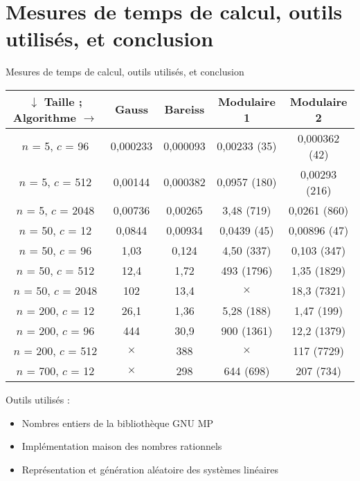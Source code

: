 \documentclass[11pt]{beamer}
\begin{document}
	\section{Mesures de temps de calcul, outils utilisés, et conclusion}
	\begin{frame}{Mesures de temps de calcul, outils utilisés, et conclusion}
		
		{\footnotesize
		\begin{tabular}{|c||c|c|c|c|}
			\hline
			$\downarrow$ Taille ; Algorithme $\rightarrow$ & Gauss & Bareiss & Modulaire 1 & Modulaire 2\\
			\hline
			\hline
			$n$ = 5, $c$ = 96 & 0,000233 & 0,000093 & 0,00233 (35) & 0,000362 (42)\\
			\hline
			$n$ = 5, $c$ = 512 & 0,00144 & 0,000382 & 0,0957 (180) & 0,00293 (216)\\
			\hline
			$n$ = 5, $c$ = 2048 & 0,00736 & 0,00265 & 3,48 (719) & 0,0261 (860)\\
			\hline
			\hline
			$n$ = 50, $c$ = 12 & 0,0844 & 0,00934 & 0,0439 (45) & 0,00896 (47)\\
			\hline
			$n$ = 50, $c$ = 96 & 1,03 & 0,124 & 4,50 (337) & 0,103 (347)\\
			\hline
			$n$ = 50, $c$ = 512 & 12,4 & 1,72 & 493 (1796) & 1,35 (1829)\\
			\hline
			$n$ = 50, $c$ = 2048 & 102 & 13,4 &  $\times$& 18,3 (7321)\\
			\hline
			\hline
			$n$ = 200, $c$ = 12 & 26,1 & 1,36 & 5,28 (188) &  1,47 (199)\\
			\hline
			$n$ = 200, $c$ = 96 & 444 & 30,9 & 900 (1361) & 12,2 (1379)\\
			\hline
			$n$ = 200, $c$ = 512 & $\times$ & 388 & $\times$ & 117 (7729)\\
			\hline
			\hline
			$n$ = 700, $c$ = 12 & $\times$ & 298 & 644 (698) & 207 (734)\\
			\hline
		\end{tabular}
		}
		\vspace{0.7cm}
		\newline
		Outils utilisés :
		\begin{itemize}
			\item Nombres entiers de la bibliothèque GNU MP
			\item Implémentation maison des nombres rationnels
			\item Représentation et génération aléatoire des systèmes linéaires
		\end{itemize}
	\end{frame}
	
\end{document}

